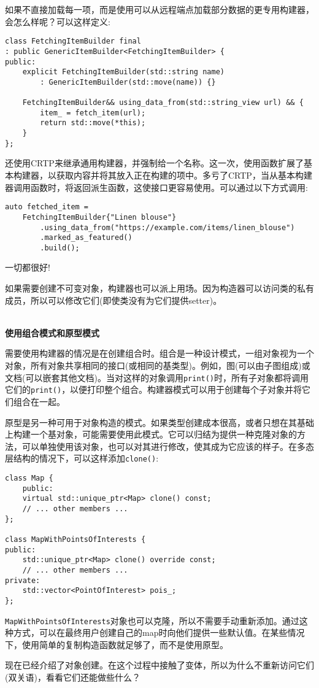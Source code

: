 如果不直接加载每一项，而是使用可以从远程端点加载部分数据的更专用构建器，会怎么样呢？可以这样定义:

\begin{lstlisting}[style=styleCXX]
class FetchingItemBuilder final
: public GenericItemBuilder<FetchingItemBuilder> {
public:
	explicit FetchingItemBuilder(std::string name)
		: GenericItemBuilder(std::move(name)) {}
	
	FetchingItemBuilder&& using_data_from(std::string_view url) && {
		item_ = fetch_item(url);
		return std::move(*this);
    }
};
\end{lstlisting}

还使用CRTP来继承通用构建器，并强制给一个名称。这一次，使用函数扩展了基本构建器，以获取内容并将其放入正在构建的项中。多亏了CRTP，当从基本构建器调用函数时，将返回派生函数，这使接口更容易使用。可以通过以下方式调用:

\begin{lstlisting}[style=styleCXX]
auto fetched_item =
	FetchingItemBuilder{"Linen blouse"}
		.using_data_from("https://example.com/items/linen_blouse")
		.marked_as_featured()
		.build();
\end{lstlisting}

一切都很好!

如果需要创建不可变对象，构建器也可以派上用场。因为构造器可以访问类的私有成员，所以可以修改它们(即使类没有为它们提供setter)。

\hspace*{\fill} \\ %
\noindent
\textbf{使用组合模式和原型模式}

需要使用构建器的情况是在创建组合时。组合是一种设计模式，一组对象视为一个对象，所有对象共享相同的接口(或相同的基类型)。例如，图(可以由子图组成)或文档(可以嵌套其他文档)。当对这样的对象调用\texttt{print()}时，所有子对象都将调用它们的\texttt{print()}，以便打印整个组合。构建器模式可以用于创建每个子对象并将它们组合在一起。

原型是另一种可用于对象构造的模式。如果类型创建成本很高，或者只想在其基础上构建一个基对象，可能需要使用此模式。它可以归结为提供一种克隆对象的方法，可以单独使用该对象，也可以对其进行修改，使其成为它应该的样子。在多态层结构的情况下，可以这样添加\texttt{clone()}:

\begin{lstlisting}[style=styleCXX]
class Map {
	public:
	virtual std::unique_ptr<Map> clone() const;
	// ... other members ...
};

class MapWithPointsOfInterests {
public:
	std::unique_ptr<Map> clone() override const;
	// ... other members ...
private:
	std::vector<PointOfInterest> pois_;
};
\end{lstlisting}

\texttt{MapWithPointsOfInterests}对象也可以克隆，所以不需要手动重新添加。通过这种方式，可以在最终用户创建自己的map时向他们提供一些默认值。在某些情况下，使用简单的复制构造函数就足够了，而不是使用原型。

现在已经介绍了对象创建。在这个过程中接触了变体，所以为什么不重新访问它们(双关语)，看看它们还能做些什么？






















